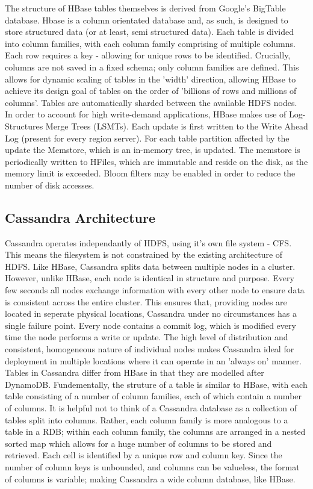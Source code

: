 \documentclass[10pt]{article}
\begin{document}
The structure of HBase tables themselves is derived from Google's BigTable database. Hbase is a column orientated database and, as such, is designed to store structured data (or at least, semi structured data). Each table is divided into column families, with each column family comprising of multiple columns. Each row requires a key - allowing for unique rows to be identified. Crucially, columns are not saved in a fixed schema; only column families are defined. This allows for dynamic scaling of tables in the 'width' direction, allowing HBase to achieve its design goal of tables on the order of 'billions of rows and millions of columns'. Tables are automatically sharded between the available HDFS nodes.\\

In order to account for high write-demand applications, HBase makes use of Log-Structures Merge Trees (LSMTs). Each update is first written to the Write Ahead Log (present for every region server). For each table partition affected by the update the Memstore, which is an in-memory tree, is updated. The memstore is periodically written to HFiles,  which are immutable and reside on the disk, as the memory limit is exceeded. Bloom filters may be enabled in order to reduce the number of disk accesses.\\

\subsection{Cassandra Architecture}
Cassandra operates independantly of HDFS, using it's own file system - CFS. This means the filesystem is not constrained by the existing architecture of HDFS. Like HBase, Cassandra splits data between multiple nodes in a cluster. However, unlike HBase, each node is identical in structure and purpose. Every few seconds all nodes exchange information with every other node to ensure data is consistent across the entire cluster. This ensures that, providing nodes are located in seperate physical locations, Cassandra under no circumstances has a single failure point. Every node contains a commit log, which is modified every time the node performs a write or update. The high level of distribution and consistent, homogeneous nature of individual nodes makes Cassandra ideal for deployment in multiple locations where it can operate in an 'always on' manner.\\

Tables in Cassandra differ from HBase in that they are modelled after DynamoDB. Fundementally, the struture of a table is similar to HBase, with each table consisting of a number of column families, each of which contain a number of columns. It is helpful not to think of a Cassandra database as a collection of tables split into columns. Rather, each column family is more analogous to a table in a RDB; within each column family, the columns are arranged in a nested sorted map which allows for a huge number of columns to be stored and retrieved. Each cell is identified by a unique row and column key. Since the number of column keys is unbounded, and columns can be valueless, the format of columns is variable; making Cassandra a wide column database, like HBase.\\
\end{document}
